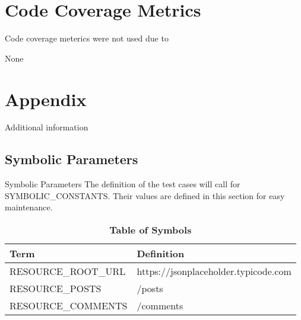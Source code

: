 \documentclass[12pt, titlepage]{article}
\begin{document}
\section{Code Coverage Metrics}
Code coverage meterics were not used due to 





None
\newpage

\section{Appendix}

Additional information

\subsection{Symbolic Parameters} \label{app:symb}{Symbolic Parameters}
The definition of the test cases will call for SYMBOLIC\_CONSTANTS.
Their values are defined in this section for easy maintenance.
\begin{table}[!htbp]
	\fontsize{9pt}{5pt}\selectfont
	\begin{tabularx}{\textwidth}{p{4cm}X}
		\toprule
		\textbf{Term} & \textbf{Definition}\\
		\midrule
		RESOURCE\_ROOT\_URL & https://jsonplaceholder.typicode.com\\
		RESOURCE\_POSTS & /posts \\
		RESOURCE\_COMMENTS & /comments \\
		\bottomrule
	\end{tabularx}
	\caption{\textbf{Table of Symbols}} \label{Table:symbols}
\end{table}	


\end{document}
